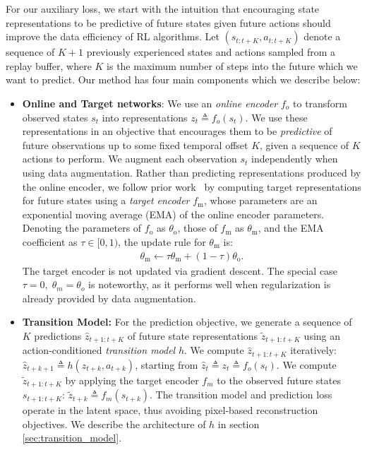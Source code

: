 For our auxiliary loss, we start with the intuition that encouraging state representations to be predictive of future states given future actions should improve the data efficiency of RL algorithms.
Let $(s_{t:t+K}, a_{t:t+K})$ denote a sequence of $K + 1$ previously experienced states and actions sampled from a replay buffer, where $K$ is the maximum number of steps into the future which we want to predict. Our method has four main components which we describe below:
\begin{itemize}[leftmargin=*]
    \item \textbf{Online and Target networks}: We use an \emph{online encoder} $f_o$ to transform observed states $s_t$ into representations $z_{t} \triangleq f_o(s_t)$.
We use these representations in an objective that encourages them to be \emph{predictive} of future observations up to some fixed temporal offset $K$, given a sequence of $K$ actions to perform.
We augment each observation $s_t$ independently when using data augmentation.
Rather than predicting representations produced by the online encoder, we follow prior work~\citep{tarvainen2017mean, BYOL} by computing target representations for future states using a \emph{target encoder} $f_\mathrm{m}$, whose parameters are an exponential moving average (EMA) of the online encoder parameters.
Denoting the parameters of $f_\mathrm{o}$ as $\theta_\mathrm{o}$, those of $f_\mathrm{m}$ as $\theta_\mathrm{m}$, and the EMA coefficient as $\tau \in[0,1)$,  the update rule for $\theta_\mathrm{m}$ is:
\begin{align}
    \theta_{\mathrm{m}} \leftarrow \tau \theta_{\mathrm{m}}+(1-\tau) \theta_{\mathrm{o}}.
\end{align}
The target encoder is not updated via gradient descent.  The special case $\tau=0, \; \theta_m=\theta_o$ is noteworthy, as it performs well when regularization is already provided by data augmentation.

    \item \textbf{Transition Model:} For the prediction objective, we generate a sequence of $K$ predictions $\hat{z}_{t+1:t+K}$ of future state representations $\tilde{z}_{t+1:t+K}$ using an action-conditioned \emph{transition model} $h$.
    We compute $\hat{z}_{t+1:t+K}$ iteratively: $\hat{z}_{t+k+1} \triangleq h(\hat{z}_{t+k}, a_{t+k})$, starting from $\hat{z}_t \triangleq z_t \triangleq f_o(s_t)$.
    We compute $\tilde{z}_{t+1:t+K}$ by applying the target encoder $f_m$ to the observed future states $s_{t+1:t+K}$: $\tilde{z}_{t+k} \triangleq f_m(s_{t+k})$.
    The transition model and prediction loss operate in the latent space, thus avoiding pixel-based reconstruction objectives. We describe the architecture of $h$ in section \ref{sec:transition_model}.


\end{itemize}
